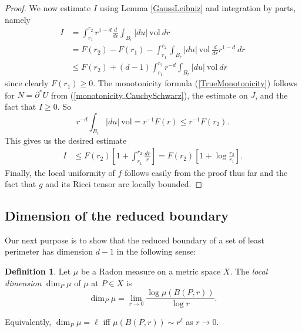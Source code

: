 \documentclass[reqno,12pt,letterpaper]{amsart}
\newcommand{\vol}{\mathrm{vol}}
\newcommand{\dfn}[1]{\emph{#1}\index{#1}}
\theoremstyle{definition}
\newtheorem{definition}[theorem]{Definition}
\numberwithin{equation}{section}
\begin{document}
\begin{proof}
We now estimate $I$ using Lemma \ref{GaussLeibniz} and integration by parts, namely
\begin{align*}
I &= \int_{r_1}^{r_2} r^{1 - d} \frac{d}{dr} \int_{B_r} |du| ~\vol ~dr \\
&= F(r_2) - F(r_1) - \int_{r_1}^{r_2} \int_{B_r} |du| ~\vol ~\frac{d}{dr} r^{1 - d} ~dr\\
&\leq F(r_2) + (d - 1) \int_{r_1}^{r_2} r^{-d} \int_{B_r} |du| ~\vol ~dr
\end{align*}
since clearly $F(r_1) \geq 0$.
The monotonicity formula (\ref{TrueMonotonicity}) follows for $N = \partial^* U$ from (\ref{monotonicity CauchySchwarz}), the estimate on $J$, and the fact that $I \geq 0$.
So
$$r^{-d} \int_{B_r} |du| ~\vol = r^{-1} F(r) \leq r^{-1} F(r_2).$$
This gives us the desired estimate
\begin{align*}
I &\leq F(r_2)\left[1 + \int_{r_1}^{r_2} \frac{dr}{r}\right] = F(r_2)\left[1 + \log\frac{r_2}{r_1}\right].
\end{align*}
Finally, the local uniformity of $f$ follows easily from the proof thus far and the fact that $g$ and its Ricci tensor are locally bounded.
\end{proof}



\subsection{Dimension of the reduced boundary}
Our next purpose is to show that the reduced boundary of a set of least perimeter has dimension $d - 1$ in the following sense:

\begin{definition}
Let $\mu$ be a Radon measure on a metric space $X$.
The \dfn{local dimension} $\dim_P \mu$ of $\mu$ at $P \in X$ is
$$\dim_P \mu = \lim_{r \to 0} \frac{\log \mu(B(P, r))}{\log r}.$$
\end{definition}

Equivalently, $\dim_P \mu = \ell$ iff $\mu(B(P, r)) \sim r^\ell$ as $r \to 0$.
\end{document}

